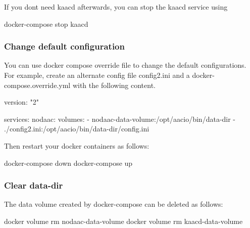 If you don\textquotesingle{}t need kaacd afterwards, you can stop the kaacd service using


\begin{DoxyCode}
docker-compose stop kaacd
\end{DoxyCode}
 \subsubsection*{Change default configuration}

You can use docker compose override file to change the default configurations. For example, create an alternate config file {\ttfamily config2.\+ini} and a {\ttfamily docker-\/compose.\+override.\+yml} with the following content.


\begin{DoxyCode}
version: "2"

services:
  nodaac:
    volumes:
      - nodaac-data-volume:/opt/aacio/bin/data-dir
      - ./config2.ini:/opt/aacio/bin/data-dir/config.ini
\end{DoxyCode}


Then restart your docker containers as follows\+:


\begin{DoxyCode}
docker-compose down
docker-compose up
\end{DoxyCode}


\subsubsection*{Clear data-\/dir}

The data volume created by docker-\/compose can be deleted as follows\+:


\begin{DoxyCode}
docker volume rm nodaac-data-volume
docker volume rm kaacd-data-volume
\end{DoxyCode}
 
